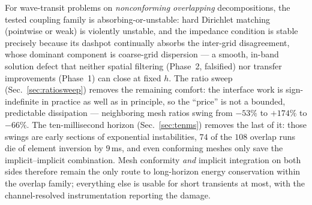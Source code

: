 \documentclass[11pt]{article}
\begin{document}
For wave-transit problems on \emph{nonconforming overlapping} decompositions,
the tested coupling family is absorbing-or-unstable: hard Dirichlet matching
(pointwise or weak) is violently unstable, and the impedance condition is
stable precisely because its dashpot continually absorbs the inter-grid
disagreement, whose dominant component is coarse-grid dispersion --- a smooth,
in-band solution defect that neither spatial filtering (Phase~2, falsified)
nor transfer improvements (Phase~1) can close at fixed $h$. The ratio sweep
(Sec.~\ref{sec:ratiosweep}) removes the remaining comfort: the interface work
is sign-indefinite in practice as well as in principle, so the ``price'' is
not a bounded, predictable dissipation --- neighboring mesh ratios swing from
$-53\%$ to $+174\%$ to $-66\%$. The ten-millisecond horizon
(Sec.~\ref{sec:tenms}) removes the last of it: those swings are early
sections of exponential instabilities, $74$ of the $108$ overlap runs die
of element inversion by $9$\,ms, and even conforming meshes only save the
implicit--implicit combination. Mesh conformity \emph{and} implicit
integration on both sides therefore remain the only route to long-horizon
energy conservation within the overlap family; everything else is usable
for short transients at most, with the channel-resolved instrumentation
reporting the damage.
\end{document}
